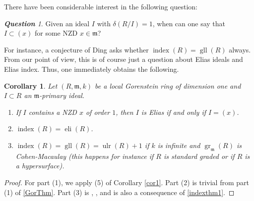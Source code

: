 \documentclass[a4paper,12pt]{amsart}
\newtheorem{cor}[thm]{\bf Corollary}
\theoremstyle{definition}
\theoremstyle{remark}
\newtheorem{question}[thm]{\bf Question}
\numberwithin{equation}{section}
\DeclareMathOperator{\gr}{{{gr}}}
\DeclareMathOperator{\eli}{{eli}}
\DeclareMathOperator{\gll}{gll}
\DeclareMathOperator{\ulr}{{ulr}}
\DeclareMathOperator{\ind}{{index}}
\def\fm{\mathfrak{m}}
\begin{document}
There have been considerable interest in the following question:

\begin{question}
Given an ideal $I$ with $\delta(R/I)=1$, when can one say that $I\subset (x)$ for some NZD $x\in \fm$?
\end{question}

For instance, a conjecture of Ding asks whether $\ind(R)=\gll(R)$ always.  From our point of view, this is of course just a question about Elias ideals and Elias index. Thus, one immediately obtains the following.

\begin{cor}\label{GorCor}
 Let $(R, \fm, k)$ be a local Gorenstein ring of dimension one and $I\subset R$ an $\fm$-primary ideal. 
 \begin{enumerate}
 \item If $I$ contains a NZD $x$ of order $1$, then $I$ is Elias if and only if $I=(x)$.
 \item $\ind(R)= \eli(R)$. 
\item $\ind(R)=\gll(R)=\ulr(R)+1$ if $k$ is infinite and $\gr_{\fm}(R)$ is Cohen-Macaulay (this happens for instance if $R$ is standard graded or if $R$ is a hypersurface). 
 \end{enumerate}
 \end{cor}

\begin{proof}
For part (1), we apply  (5) of Corollary \ref{cor1}.
Part (2) is trivial from part (1) of \ref{GorThm}. Part (3) is \cite[Theorem 2.1]{Din0}, \cite[Corollary 2.11]{DeS}, and  is also a consequence of \ref{indexthm1}.

\end{proof}
\end{document}
